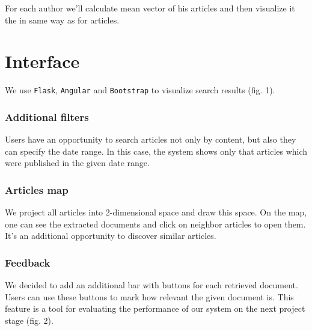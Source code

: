 For each author we'll calculate mean vector of his articles and then visualize it the in same way as for articles.

\section{Interface}
We use \texttt{Flask}, \texttt{Angular} and \texttt{Bootstrap} to visualize search results (fig. 1).

\subsubsection{Additional filters}
Users have an opportunity to search articles not only by content, but also they can specify the date range. In this case, the system shows only that articles which were published in the given date range.

\subsubsection{Articles map}
We project all articles into 2-dimensional space and draw this space. On the map, one can see the extracted documents and click on neighbor articles to open them. It's an additional opportunity to discover similar articles.  

\subsubsection{Feedback}
We decided to add an additional bar with buttons for each retrieved document. Users can use these buttons to mark how relevant the given document is. This feature is a tool for evaluating the performance of our system on the next project stage (fig. 2).

